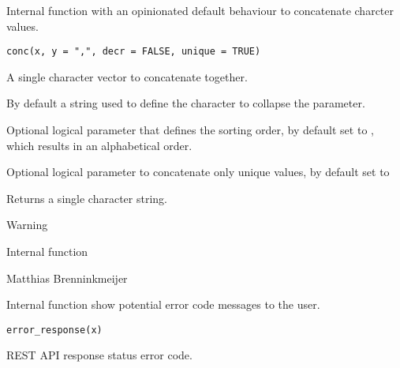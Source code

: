 \documentclass[a4paper]{book}
\begin{document}
%
\begin{Description}\relax
Internal function with an opinionated default behaviour to concatenate charcter values.
\end{Description}
%
\begin{Usage}
\begin{verbatim}
conc(x, y = ",", decr = FALSE, unique = TRUE)
\end{verbatim}
\end{Usage}
%
\begin{Arguments}
\begin{ldescription}
\item[\code{x}] A single character vector to concatenate together.

\item[\code{y}] By default a \code{,} string used to define the character to collapse the  parameter.

\item[\code{decr}] Optional logical parameter that defines the sorting order, by default set to , which results in an alphabetical order.

\item[\code{unique}] Optional logical parameter to concatenate only unique values, by default set to 
\end{ldescription}
\end{Arguments}
%
\begin{Value}
Returns a single character string.
\end{Value}
%
\begin{Section}{Warning}

Internal function
\end{Section}
%
\begin{Author}\relax
Matthias Brenninkmeijer 
\end{Author}
%
\begin{Description}\relax
Internal function show potential error code messages to the user.
\end{Description}
%
\begin{Usage}
\begin{verbatim}
error_response(x)
\end{verbatim}
\end{Usage}
%
\begin{Arguments}
\begin{ldescription}
\item[\code{x}] REST API response status error code.
\end{ldescription}
\end{Arguments}
\end{document}
